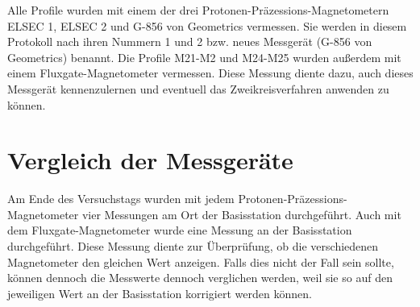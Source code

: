 Alle Profile wurden mit einem der drei Protonen-Präzessions-Magnetometern ELSEC 1, ELSEC 2 und G-856 von Geometrics vermessen. Sie werden in diesem Protokoll nach ihren Nummern 1 und 2 bzw. neues Messgerät (G-856 von Geometrics) benannt. Die Profile M21-M2 und M24-M25 wurden außerdem mit einem Fluxgate-Magnetometer vermessen. Diese Messung diente dazu, auch dieses Messgerät kennenzulernen und eventuell das Zweikreisverfahren anwenden zu können.

\section{Vergleich der Messgeräte}

Am Ende des Versuchstags wurden mit jedem Protonen-Präzessions-Magnetometer vier Messungen am Ort der Basisstation durchgeführt. Auch mit dem Fluxgate-Magnetometer wurde eine Messung an der Basisstation durchgeführt. Diese Messung diente zur Überprüfung, ob die verschiedenen Magnetometer den gleichen Wert anzeigen. Falls dies nicht der Fall sein sollte, können dennoch die Messwerte dennoch verglichen werden, weil sie so auf den jeweiligen Wert an der Basisstation korrigiert werden können.